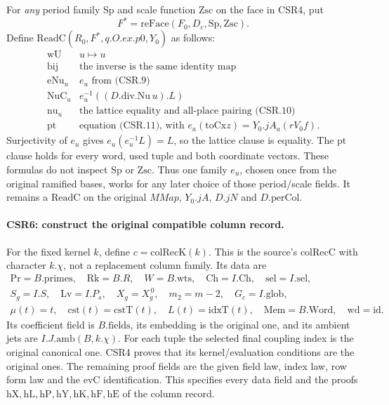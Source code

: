 For \emph{any} period family \(\mathrm{Sp}\) and scale function
\(\mathrm{Zsc}\) on the face in CSR4, put
\[
 F^*=\mathrm{reFace}(F_0,D_c,\mathrm{Sp},\mathrm{Zsc}).
\]
Define \(\mathrm{ReadC}(R_0,F^*,q.O.ex.p0,Y_0)\) as follows:
\[
 \begin{array}{c|l}
 \mathrm{wU}&u\mapsto u\\
 \mathrm{bij}&\text{the inverse is the same identity map}\\
 \mathrm{eNu}_u&e_u\text{ from (CSR.9)}\\
 \mathrm{NuC}_u&e_u^{-1}((D.\mathrm{div.Nu}\,u).L)\\
 \mathrm{nu}_u&\text{the lattice equality and all-place pairing (CSR.10)}\\
 \mathrm{pt}&\text{equation (CSR.11), with }e_a(\mathrm{toCx}z)
                  =Y_0.jA_a(rV_0f).
 \end{array}                                                    \tag{CSR.12}
\]
Surjectivity of \(e_u\) gives
\(e_u(e_u^{-1}L)=L\), so the lattice clause is equality.
The \(\mathrm{pt}\) clause holds for every word, used tuple and both
coordinate vectors. These formulas do not inspect \(\mathrm{Sp}\)
or \(\mathrm{Zsc}\). Thus one family \(e_u\), chosen once from the
original ramified bases, works for any later choice of those
period/scale fields. It remains a \(\mathrm{ReadC}\) on the
original \(MMap\), \(Y_0.jA\), \(D.jN\) and \(D.\mathrm{perCol}\).

\paragraph{CSR6: construct the original compatible column record.}
\label{claim:CSR6}
For the fixed kernel \(k\), define \(c=\mathrm{colRecK}(k)\).
This is the source's \(\mathrm{colRecC}\) with character \(k.\chi\),
not a replacement column family. Its data are
\[
 \begin{gathered}
 \mathrm{Pr}=B.\mathrm{primes},\quad
 \mathrm{Rk}=B.R,\quad W=B.\mathrm{wts},\quad
 \mathrm{Ch}=I.\mathrm{Ch},\quad \mathrm{sel}=I.\mathrm{sel},\\
 S_g=I.S,\quad \mathrm{Lv}=I.P_s,\quad X_g=X_g^{\,0},
 \quad m_2=m-2,\quad G_c=I.\mathrm{glob},\\
 \mu(t)=t,\quad \mathrm{cst}(t)=\mathrm{cstT}(t),\quad
 L(t)=\mathrm{idxT}(t),\quad
 \mathrm{Mem}=B.\mathrm{Word},\quad \mathrm{wd}=\mathrm{id}.
 \end{gathered}                                                   \tag{CSR.13}
\]
Its coefficient field is \(B.\mathrm{fields}\), its embedding is the
original one, and its ambient jets are \(I.J.\mathrm{amb}(B,k.\chi)\).
For each tuple the selected final coupling index is the original
canonical one. CSR4 proves that its kernel/evaluation conditions
are the original ones. The remaining proof fields are the given
field law, index law, row form law and the \(\mathrm{evC}\)
identification. This specifies every data field and the proofs
\(\mathrm{hX,hL,hP,hY,hK,hF,hE}\) of the column record.

